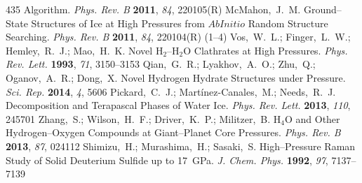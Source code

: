 \documentclass[12pt,letterpaper,oneside]{article}
\begin{document}
\begin{mcitethebibliography}{435}
  Algorithm. \emph{Phys. Rev. B} \textbf{2011}, \emph{84}, 220105(R)\relax
\mciteBstWouldAddEndPuncttrue
\mciteSetBstMidEndSepPunct{\mcitedefaultmidpunct}
{\mcitedefaultendpunct}{\mcitedefaultseppunct}\relax
\EndOfBibitem
{}
McMahon,~J.~M. Ground--State Structures of Ice at High Pressures from $Ab
  Initio$ Random Structure Searching. \emph{Phys. Rev. B} \textbf{2011},
  \emph{84}, 220104(R) (1--4)\relax
\mciteBstWouldAddEndPuncttrue
\mciteSetBstMidEndSepPunct{\mcitedefaultmidpunct}
{\mcitedefaultendpunct}{\mcitedefaultseppunct}\relax
\EndOfBibitem
{}
Vos,~W.~L.; Finger,~L.~W.; Hemley,~R.~J.; Mao,~H.~K. Novel H$_2$--H$_2$O
  Clathrates at High Pressures. \emph{Phys. Rev. Lett.} \textbf{1993},
  \emph{71}, 3150--3153\relax
\mciteBstWouldAddEndPuncttrue
\mciteSetBstMidEndSepPunct{\mcitedefaultmidpunct}
{\mcitedefaultendpunct}{\mcitedefaultseppunct}\relax
\EndOfBibitem
{}
Qian,~G.~R.; Lyakhov,~A.~O.; Zhu,~Q.; Oganov,~A.~R.; Dong,~X. Novel Hydrogen
  Hydrate Structures under Pressure. \emph{Sci. Rep.} \textbf{2014}, \emph{4},
  5606\relax
\mciteBstWouldAddEndPuncttrue
\mciteSetBstMidEndSepPunct{\mcitedefaultmidpunct}
{\mcitedefaultendpunct}{\mcitedefaultseppunct}\relax
\EndOfBibitem
{}
Pickard,~C.~J.; Mart{\'i}nez-Canales,~M.; Needs,~R.~J. Decomposition and
  Terapascal Phases of Water Ice. \emph{Phys. Rev. Lett.} \textbf{2013},
  \emph{110}, 245701\relax
\mciteBstWouldAddEndPuncttrue
\mciteSetBstMidEndSepPunct{\mcitedefaultmidpunct}
{\mcitedefaultendpunct}{\mcitedefaultseppunct}\relax
\EndOfBibitem
{}
Zhang,~S.; Wilson,~H.~F.; Driver,~K.~P.; Militzer,~B. H$_4$O and Other
  Hydrogen--Oxygen Compounds at Giant--Planet Core Pressures. \emph{Phys. Rev.
  B} \textbf{2013}, \emph{87}, 024112\relax
\mciteBstWouldAddEndPuncttrue
\mciteSetBstMidEndSepPunct{\mcitedefaultmidpunct}
{\mcitedefaultendpunct}{\mcitedefaultseppunct}\relax
\EndOfBibitem
{}
Shimizu,~H.; Murashima,~H.; Sasaki,~S. High--Pressure Raman Study of Solid
  Deuterium Sulfide up to 17~GPa. \emph{J. Chem. Phys.} \textbf{1992},
  \emph{97}, 7137--7139\relax
\mciteBstWouldAddEndPuncttrue
\mciteSetBstMidEndSepPunct{\mcitedefaultmidpunct}
{\mcitedefaultendpunct}{\mcitedefaultseppunct}\relax

\end{mcitethebibliography}
\end{document}
